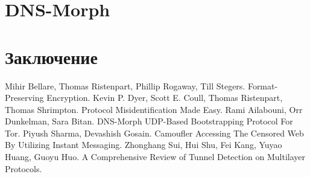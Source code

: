\section{DNS-Morph}
\section{Заключение}

\newpage

\begin{thebibliography}{9}
\bibitem {} Mihir Bellare, Thomas Ristenpart, Phillip Rogaway, Till Stegers. Format-Preserving Encryption.
\bibitem {} Kevin P. Dyer, Scott E. Coull, Thomas Ristenpart, Thomas Shrimpton. Protocol Misidentification Made Easy.
\bibitem {} Rami Ailabouni, Orr Dunkelman, Sara Bitan. DNS-Morph UDP-Based Bootstrapping Protocol For Tor.
\bibitem {} Piyush Sharma, Devashish Gosain. Camoufler Accessing The Censored Web By Utilizing Instant Messaging.
\bibitem {} Zhonghang Sui, Hui Shu, Fei Kang, Yuyao Huang, Guoyu Huo. A Comprehensive Review of Tunnel Detection on Multilayer Protocols.
\end{thebibliography}



